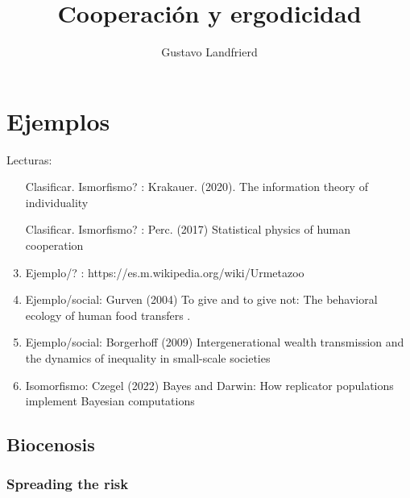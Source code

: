 \documentclass[a4paper,10pt]{article}
\title{Cooperación y ergodicidad}
\author{Gustavo Landfrierd}
\begin{document}
\maketitle
\tableofcontents

\newpage

\section{Ejemplos}

Lecturas:
\begin{enumerate}
\item [Clasificar. Ismorfismo?]: Krakauer. (2020). The information theory of individuality~\cite{krakauer2020-informationTheoryOfIndividuality}
\item [Clasificar. Ismorfismo?]: Perc. (2017) Statistical physics of human cooperation~\cite{perc2017-statisticalPhysicsCooperation}
\item Ejemplo/? : https://es.m.wikipedia.org/wiki/Urmetazoo
\item Ejemplo/social: Gurven (2004) To give and to give not: The behavioral ecology of human food transfers \cite{gurven2004-foodTransfers}.
\item Ejemplo/social: Borgerhoff (2009) Intergenerational wealth transmission and the dynamics of inequality in small-scale societies \cite{borgerhoff2009-wealth}
\item Isomorfismo: Czegel (2022) Bayes and Darwin: How replicator populations implement Bayesian computations \cite{czegel2022-bayesDarwin} 
\end{enumerate}


\subsection{Biocenosis}

\subsubsection{Spreading the risk}
\end{document}
